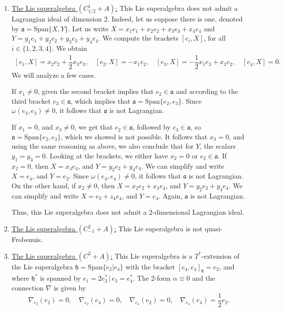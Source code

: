 \documentclass[12pt]{amsart}
\begin{document}
\begin{enumerate}
    \[\nabla_{e_1}(e_1) = -e_1,\quad  \nabla_{e_1}(x) = -x, \quad  \nabla_{x}(e_1) = -x, \quad \nabla_{x}(x) = 0.\]
    
    \item \underline{The Lie superalgebra $(C^1_{1/2}+A)$:} This Lie superalgebra does not admit a Lagrangian ideal of dimension 2. Indeed, let us suppose there is one, denoted by  $\mathfrak{a}=\mathrm{Span}\{X,Y\}$. Let us write $X=x_1e_1+x_2e_2+x_3e_3+x_4e_4$ and $Y=y_1e_1+y_2e_2+y_3e_3+y_4e_4$. 
    We compute the brackets  $[e_i,X]$,  for all $i\in \{1,2,3,4\}$. We obtain
    \[ 
    \begin{array}{l}
    [e_1, X]=x_2e_2 + \dfrac{1}{2}x_3 e_3, \quad  [e_2, X]=-x_1e_2, \quad 
    [e_3,X]=-\dfrac{1}{2}x_1 e_3+x_3 e_2, \quad  [e_4, X]=0.
    \end{array}
    \]
    We will analyze a few cases. 
    
    If $x_1 \neq 0$, given the second bracket implies that $e_2 \in \mathfrak{a}$ and according to the third bracket $e_3 \in \mathfrak{a}$, which implies that $\mathfrak{a}=\mathrm{Span}\{e_2, e_3\}$. Since $\omega(e_3,e_3)\not =0$, it follows that $\mathfrak a$ is not Lagrangian. 
    
    If $x_1=0$, and $x_3 \neq 0$, we get that $e_2 \in \mathfrak{a}$, followed by $e_3 \in \mathfrak{a}$, so $\mathfrak{a}=\mathrm{Span}\{e_2, e_3\}$,  which we showed is not possible.
    It follows that $x_3 =0$, and using the same reasoning as above, we also conclude  that for $Y$, the scalars $y_1=y_3=0$. Looking at the brackets, we either have $x_2=0$ or $e_2 \in \mathfrak{a}$. 
    If $x_2=0$, then $X=x_4 e_4$, and $Y=y_2 e_2 +y_4 e_4$. We can simplify and write $X=e_4$, and $Y=e_2$. Since $\omega(e_4,e_4)\not =0$, it follows that  $\mathfrak{a}$ is not Lagrangian. On the other hand,  if $x_2\neq 0$, then $X=x_2e_2+ x_4 e_4$, and $Y=y_2 e_2 +y_4 e_4$. We can simplify and write $X=e_2+z_4 e_4$, and $Y= e_4$. Again, $\mathfrak{a}$  is not Lagrangian. 
    
    Thus, this Lie superalgebra does not admit a 2-dimensional Lagrangian ideal.
    
    \item \underline{The Lie superalgebra $(C^2_{-1}+A)$:} This Lie superalgebra is not quasi-Frobenuis. 
    \item \underline{The Lie superalgebra $(C^3+A)$:} This Lie superalgebra is a $ T^*$-extension of the Lie superalgebra $\mathfrak{h}=\mathrm{Span}\{e_2 | e_4\}$ with the bracket $[e_4,e_4]_{\mathfrak h} = e_2$, and where $\mathfrak{h}^*$ is spanned by $e_1 = 2 e_2^{*}\, | \, e_3 = e_4^{*}$. The 2-form $\alpha \equiv 0$ and the connection $\nabla$ is given by
    \[\nabla_{e_2}(e_2) = 0,\quad  \nabla_{e_2}(e_4) =0 , \quad  \nabla_{e_4}(e_2) = 0, \quad \nabla_{e_4}(e_4) = \frac{1}{2}e_2.\]
    

\end{enumerate}
\end{document}
